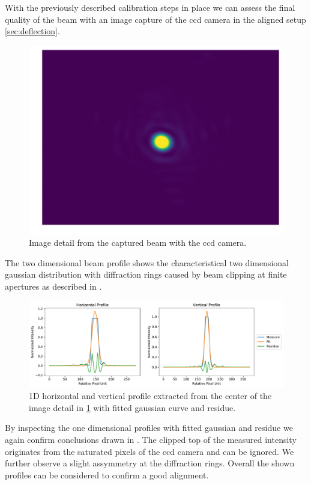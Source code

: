 With the previously described calibration steps in place we can assess the
final quality of the beam with an image capture of the \gls{ccd} camera in the
aligned setup \cref{sec:deflection}.

\begin{figure}[h]
  \centering
  \includegraphics[width=.5\textwidth]{images/camera/profile2d.pdf}
  \caption{Image detail from the captured beam with the \gls{ccd} camera.}
  \label{fig:beamprofile:2d}
\end{figure}

The two dimensional beam profile shows the characteristical two dimensional
gaussian distribution with diffraction rings caused by beam clipping at
finite apertures as described in \cite{Hertlein2017}.

\begin{figure}[h]
  \centering
  \includegraphics[width=\textwidth]{images/camera/profile1d.pdf}
  \caption{1D horizontal and vertical profile extracted from the center of
    the image detail in \cref{fig:beamprofile:2d} with fitted gaussian curve
  and residue.}
  \label{fig:beamprofile:1d}
\end{figure}

By inspecting the one dimensional profiles with fitted gaussian and residue
we again confirm conclusions drawn in \cite{Hertlein2017}. The clipped top
of the measured intensity originates from the saturated pixels of the
\gls{ccd} camera and can be ignored. We further observe a slight assymmetry
at the diffraction rings. Overall the shown profiles can be considered to
confirm a good alignment.
